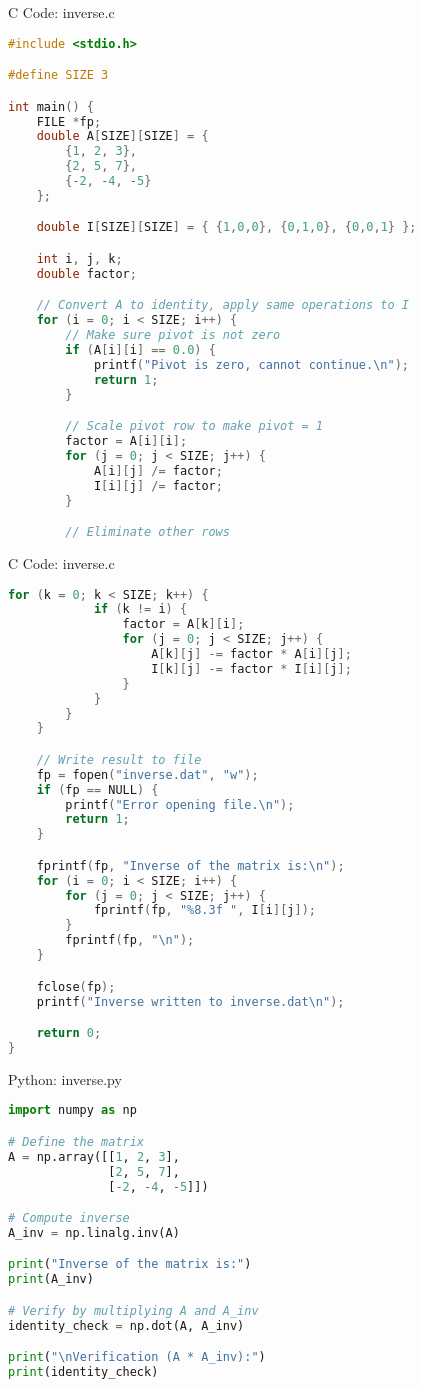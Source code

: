 \documentclass{beamer}
\numberwithin{equation}{section}
\theoremstyle{remark}
\begin{document}
\begin{frame}[fragile]{C Code: inverse.c}
\begin{lstlisting}[language=C]
#include <stdio.h>

#define SIZE 3

int main() {
    FILE *fp;
    double A[SIZE][SIZE] = {
        {1, 2, 3},
        {2, 5, 7},
        {-2, -4, -5}
    };

    double I[SIZE][SIZE] = { {1,0,0}, {0,1,0}, {0,0,1} };

    int i, j, k;
    double factor;

    // Convert A to identity, apply same operations to I
    for (i = 0; i < SIZE; i++) {
        // Make sure pivot is not zero
        if (A[i][i] == 0.0) {
            printf("Pivot is zero, cannot continue.\n");
            return 1;
        }

        // Scale pivot row to make pivot = 1
        factor = A[i][i];
        for (j = 0; j < SIZE; j++) {
            A[i][j] /= factor;
            I[i][j] /= factor;
        }

        // Eliminate other rows
                \end{lstlisting}
\end{frame}

\begin{frame}[fragile]{C Code: inverse.c}
\begin{lstlisting}[language=C]
        for (k = 0; k < SIZE; k++) {
            if (k != i) {
                factor = A[k][i];
                for (j = 0; j < SIZE; j++) {
                    A[k][j] -= factor * A[i][j];
                    I[k][j] -= factor * I[i][j];
                }
            }
        }
    }

    // Write result to file
    fp = fopen("inverse.dat", "w");
    if (fp == NULL) {
        printf("Error opening file.\n");
        return 1;
    }

    fprintf(fp, "Inverse of the matrix is:\n");
    for (i = 0; i < SIZE; i++) {
        for (j = 0; j < SIZE; j++) {
            fprintf(fp, "%8.3f ", I[i][j]);
        }
        fprintf(fp, "\n");
    }

    fclose(fp);
    printf("Inverse written to inverse.dat\n");

    return 0;
}  \end{lstlisting}
\end{frame}

\begin{frame}[fragile]{Python: inverse.py}
\begin{lstlisting}[language=Python]
import numpy as np

# Define the matrix
A = np.array([[1, 2, 3],
              [2, 5, 7],
              [-2, -4, -5]])

# Compute inverse
A_inv = np.linalg.inv(A)

print("Inverse of the matrix is:")
print(A_inv)

# Verify by multiplying A and A_inv
identity_check = np.dot(A, A_inv)

print("\nVerification (A * A_inv):")
print(identity_check)

\end{lstlisting}
\end{frame} 
\end{document}
